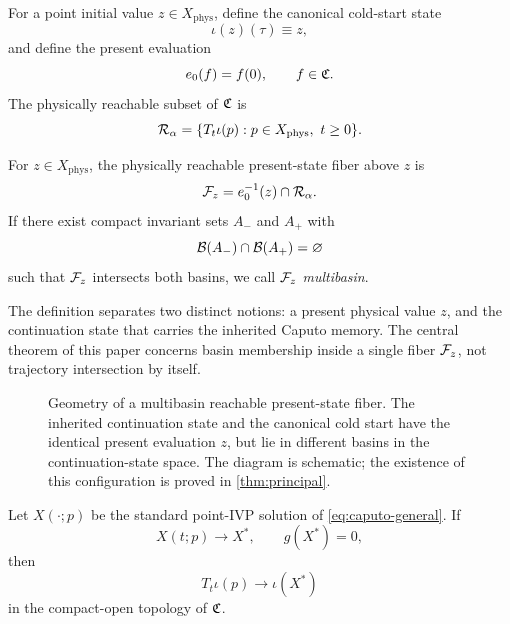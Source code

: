 For a point initial value \(z\in X_{\mathrm{phys}}\), define the canonical cold-start state
\[
  \iota(z)(\tau)\equiv z,
\]
and define the present evaluation
\[
  e_0(f)=f(0),
  \qquad f\in\mathfrak{C}.
\]
The physically reachable subset of \(\mathfrak{C}\) is
\begin{equation}
  \mathcal{R}_{\alpha}
  =
  \{T_t\iota(p):p\in X_{\mathrm{phys}},\ t\ge0\}.
  \label{eq:reachable-set}
\end{equation}

\begin{definition}
\label{def:reachable-fiber}
For \(z\in X_{\mathrm{phys}}\), the physically reachable present-state fiber above \(z\) is
\begin{equation}
  \mathcal{F}_{z}
  =
  e_0^{-1}(z)\cap\mathcal{R}_{\alpha}.
  \label{eq:fiber}
\end{equation}
If there exist compact invariant sets \(A_-\) and \(A_+\) with
\[
  \mathcal{B}(A_-)\cap\mathcal{B}(A_+)=\varnothing
\]
such that \(\mathcal{F}_{z}\) intersects both basins, we call \(\mathcal{F}_{z}\) \emph{multibasin}.
\end{definition}

The definition separates two distinct notions: a present physical value \(z\), and the continuation state that carries the inherited Caputo memory. The central theorem of this paper concerns basin membership inside a single fiber \(\mathcal{F}_{z}\), not trajectory intersection by itself.

\begin{figure}[t]
  \centering
  \resizebox{\textwidth}{!}{}
  \caption{Geometry of a multibasin reachable present-state fiber.  The inherited continuation state and the canonical cold start have the identical present evaluation \(z\), but lie in different basins in the continuation-state space.  The diagram is schematic; the existence of this configuration is proved in \cref{thm:principal}.}
  \label{fig:fiber-geometry}
\end{figure}

\begin{proposition}
\label{prop:physical-to-continuation}
Let \(X(\cdot;p)\) be the standard point-IVP solution of \eqref{eq:caputo-general}. If
\[
  X(t;p)\to X^*,
  \qquad
  g(X^*)=0,
\]
then
\[
  T_t\iota(p)\to\iota(X^*)
\]
in the compact-open topology of \(\mathfrak{C}\).
\end{proposition}

